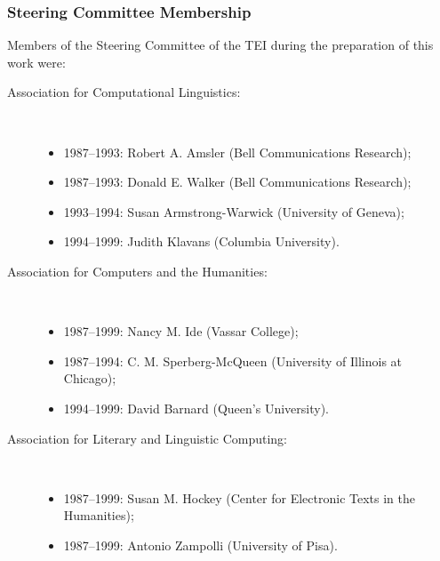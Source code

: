 \subsubsection[{Steering Committee Membership}]{Steering Committee Membership}\label{WGSC}\par
Members of the Steering Committee of the TEI during the preparation of this work were: \begin{description}

\item[{Association for Computational Linguistics:}]\hspace{1em}\hfill\linebreak
\mbox{}\\[-10pt] \begin{itemize}
\item 1987–1993: Robert A. Amsler (Bell Communications Research);
\item 1987–1993: Donald E. Walker (Bell Communications Research);
\item 1993–1994: Susan Armstrong-Warwick (University of Geneva);
\item 1994–1999: Judith Klavans (Columbia University).
\end{itemize} 
\item[{Association for Computers and the Humanities:}]\hspace{1em}\hfill\linebreak
\mbox{}\\[-10pt] \begin{itemize}
\item 1987–1999: Nancy M. Ide (Vassar College);
\item 1987–1994: C. M. Sperberg-McQueen (University of Illinois at Chicago);
\item 1994–1999: David Barnard (Queen's University).
\end{itemize} 
\item[{Association for Literary and Linguistic Computing:}]\hspace{1em}\hfill\linebreak
\mbox{}\\[-10pt] \begin{itemize}
\item 1987–1999: Susan M. Hockey (Center for Electronic Texts in the Humanities);
\item 1987–1999: Antonio Zampolli (University of Pisa).
\end{itemize} 
\end{description} 